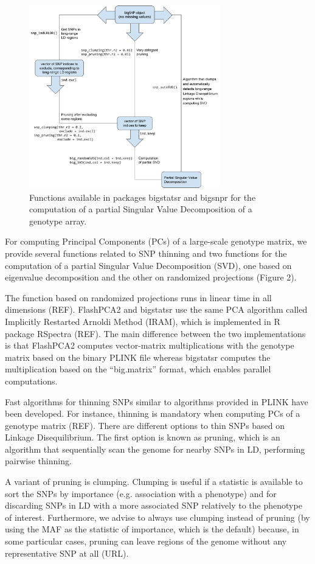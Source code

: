 \documentclass{bioinfo}
\begin{document}
\begin{methods}
\begin{figure}[!tpb]
\centerline{\includegraphics[width=235pt]{svd.pdf}}
\caption{Functions available in packages bigstatsr and bigsnpr for the computation of a partial Singular Value Decomposition of a genotype array.}\label{fig:svd}
\end{figure}

For computing Principal Components (PCs) of a large-scale genotype matrix, we provide several functions related to SNP thinning and two functions for the computation of a partial Singular Value Decomposition (SVD), one based on eigenvalue decomposition and the other on randomized projections (Figure 2).

The function based on randomized projections runs in linear time in all dimensions (REF). FlashPCA2 and bigstatsr use the same PCA algorithm called Implicitly Restarted Arnoldi Method (IRAM), which is implemented in R package RSpectra (REF). The main difference between the two implementations is that FlashPCA2 computes vector-matrix multiplications with the genotype matrix based on the binary PLINK file whereas bigstatsr computes the multiplication based on the ``big.matrix'' format, which enables parallel computations. 
 
Fast algorithms for thinning SNPs  similar to algorithms provided in PLINK have been developed. For instance, thinning is mandatory when computing PCs of a genotype matrix (REF). There are different options to thin SNPs based on Linkage Disequilibrium. The first option is known as pruning, which is an algorithm that sequentially scan the genome for nearby SNPs in LD, performing pairwise thinning.

A variant of pruning is clumping. Clumping is useful if a statistic is available to sort the SNPs by importance (e.g. association with a phenotype) and for discarding SNPs in LD with a more associated SNP relatively to the phenotype of interest. Furthermore, we advise to always use clumping instead of pruning (by using the MAF as the statistic of importance, which is the default) because, in some particular cases, pruning can leave regions of the genome without any representative SNP at all (URL).


\end{methods}
\end{document}
